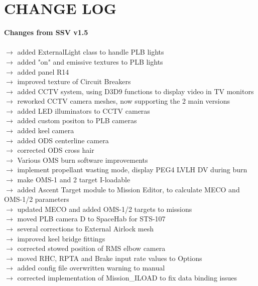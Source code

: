 \documentclass[Space_Shuttle_Vessel_Manual.tex]{subfiles}
\begin{document}
\section{CHANGE LOG}
\label{sec:change-log}
\noindent
\textbf{Changes from SSV v1.5}\\\\
$\rightarrow$ added ExternalLight class to handle PLB lights\\
$\rightarrow$ added "on" and emissive textures to PLB lights\\
$\rightarrow$ added panel R14\\
$\rightarrow$ improved texture of Circuit Breakers\\
$\rightarrow$ added CCTV system, using D3D9 functions to display video in TV monitors\\
$\rightarrow$ reworked CCTV camera meshes, now supporting the 2 main versions\\
$\rightarrow$ added LED illuminators to CCTV cameras\\
$\rightarrow$ added custom positon to PLB cameras\\
$\rightarrow$ added keel camera\\
$\rightarrow$ added ODS centerline camera\\
$\rightarrow$ corrected ODS cross hair\\
$\rightarrow$ Various OMS burn software improvements\\
$\rightarrow$ implement propellant wasting mode, display PEG4 LVLH DV during burn\\
$\rightarrow$ make OMS-1 and 2 target I-loadable\\
$\rightarrow$ added Ascent Target module to Mission Editor, to calculate MECO and OMS-1/2 parameters\\
$\rightarrow$ updated MECO and added OMS-1/2 targets to missions\\
$\rightarrow$ moved PLB camera D to SpaceHab for STS-107\\
$\rightarrow$ several corrections to External Airlock mesh\\
$\rightarrow$ improved keel bridge fittings\\
$\rightarrow$ corrected stowed position of RMS elbow camera\\
$\rightarrow$ moved RHC, RPTA and Brake input rate values to Options\\
$\rightarrow$ added config file overwritten warning to manual\\
$\rightarrow$ corrected implementation of Mission\_ILOAD to fix data binding issues\\
\end{document}
